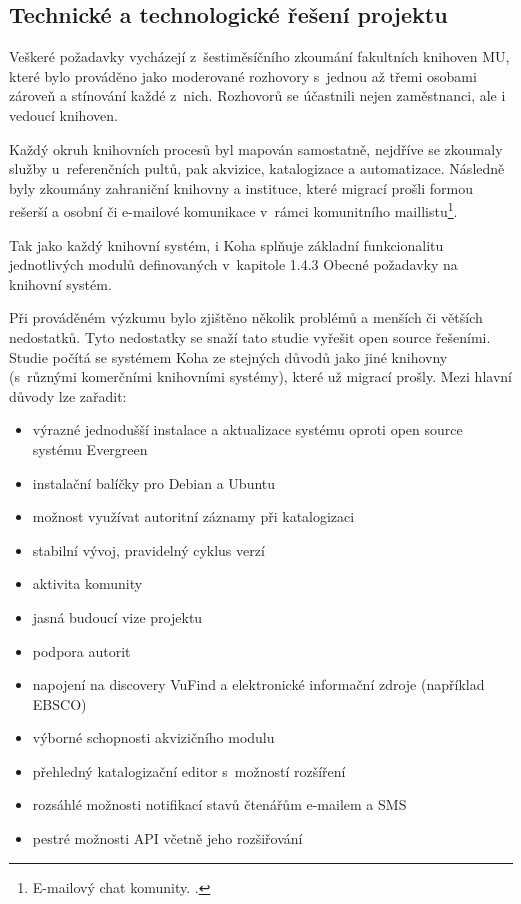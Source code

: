 \documentclass[
	11pt, oneside, printed, draft, 
	table,   %
	lof,     %
	lot     %
]{fithesis3}
\begin{document}
{\subsection{Technické a technologické řešení projektu}

Veškeré požadavky vycházejí z~šestiměsíčního zkoumání fakultních knihoven MU, které bylo prováděno jako moderované rozhovory s~jednou až třemi osobami zároveň a stínování každé z~nich. Rozhovorů se účastnili nejen zaměstnanci, ale i vedoucí knihoven. 

Každý okruh knihovních procesů byl mapován samostatně, nejdříve se zkoumaly služby u~referenčních pultů, pak akvizice, katalogizace a automatizace. Následně byly zkoumány zahraniční knihovny a instituce, které migrací prošli formou rešerší a osobní či e-mailové komunikace v~rámci komunitního maillistu\footnote{E-mailový chat komunity.
.}. 

Tak jako každý knihovní systém, i Koha splňuje základní funkcionalitu jednotlivých modulů definovaných v~kapitole 1.4.3 Obecné požadavky na knihovní systém.%

Při prováděném výzkumu bylo zjištěno několik problémů a menších či větších nedostatků. Tyto nedostatky se snaží tato studie vyřešit open source řešeními. Studie počítá se systémem Koha ze stejných důvodů jako jiné knihovny (s~různými komerčními knihovními systémy), které už migrací prošly. Mezi hlavní důvody lze zařadit: 

\begin{itemize}
\item výrazné jednodušší instalace a aktualizace systému oproti open source systému Evergreen
\item instalační balíčky pro Debian a Ubuntu
\item možnost využívat autoritní záznamy při katalogizaci
\item stabilní vývoj, pravidelný cyklus verzí
\item aktivita komunity
\item jasná budoucí vize projektu
\item podpora autorit
\item napojení na discovery VuFind a elektronické informační zdroje (například EBSCO)
\item výborné schopnosti akvizičního modulu
\item přehledný katalogizační editor s~možností rozšíření
\item rozsáhlé možnosti notifikací stavů čtenářům e-mailem a SMS
\item pestré možnosti API včetně jeho rozšiřování
\end{itemize}

}
\end{document}
